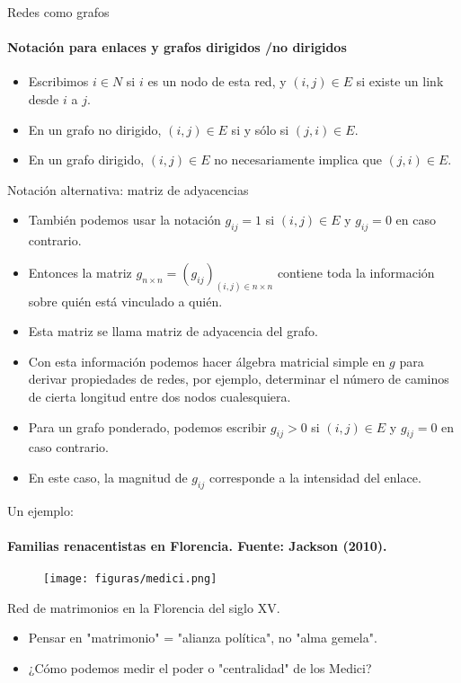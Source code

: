 \documentclass[11pt]{beamer}
\begin{document}
\begin{frame}{Redes como grafos}
    \framesubtitle{Notación para enlaces y grafos dirigidos /no dirigidos}
    \begin{itemize}
        \item Escribimos $i \in N$ si $i$ es un nodo de esta red, y $(i, j ) \in E$ si
existe un link desde $i$ a $j$.
\item  En un grafo no dirigido, $(i, j ) \in E$ si y sólo si $(j, i ) \in E$.
\item En un grafo dirigido, $(i, j ) \in E$ no necesariamente implica que $(j, i ) \in E$.
    \end{itemize}
\end{frame}

\begin{frame}{Notación alternativa: matriz de adyacencias}
  \begin{itemize}
      \item También podemos usar la notación $g_{ij} = 1$ si $(i, j ) \in E$ y $g_{ij} = 0$ en caso contrario.
\item Entonces la matriz $g_{ n \times n} = (g_{ij} )_{(i ,j ) \in n \times n}  $ contiene toda la información sobre quién está vinculado a quién.
\item Esta matriz se llama matriz de adyacencia del grafo.
\item Con esta información podemos hacer álgebra matricial simple en $g$ para derivar propiedades de redes, por ejemplo, determinar el número de caminos de cierta longitud entre dos nodos cualesquiera.
\item Para un grafo ponderado, podemos escribir $g_{ij} > 0$ si $(i, j ) \in E$ y $g_{ij} = 0$ en caso contrario.
\item En este caso, la magnitud de $g_{ij}$ corresponde a la intensidad del enlace.
  \end{itemize}  
\end{frame}

\begin{frame}{Un ejemplo:}
\framesubtitle{Familias renacentistas en Florencia. Fuente: Jackson (2010).}
    \begin{figure}
        \centering
        \texttt{[image: figuras/medici.png]}
        \label{fig:my_label}
    \end{figure}
Red de matrimonios en la Florencia del siglo XV.
\begin{itemize}
    \item Pensar en "matrimonio" = "alianza política", no "alma gemela".
\item ¿Cómo podemos medir el poder o "centralidad" de los Medici?    
\end{itemize}
\end{frame}
\end{document}
